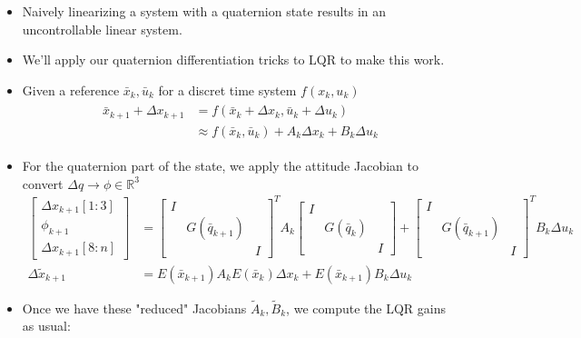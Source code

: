 \begin{itemize}
    \item Naively linearizing a system with a quaternion state results in an uncontrollable linear system.
    \item We'll apply our quaternion differentiation tricks to LQR to make this work.
    \item Given a reference $\bar{x}_k, \bar{u}_k$ for a discret time system $f(x_k, u_k)$
    \begin{align}
        \begin{split}
            \bar{x}_{k+1} + \Delta x_{k+1} & = f(\bar{x}_k + \Delta x_k, \bar{u}_k + \Delta u_k) \\
            & \approx f(\bar{x}_k, \bar{u}_k) + A_k \Delta x_k + B_k \Delta u_k
        \end{split}
    \end{align}
    \item For the quaternion part of the state, we apply the attitude Jacobian to convert $\Delta q \to \phi \in \mathbb{R}^3$
    \begin{align}
        \begin{bmatrix}
            \Delta x_{k+1}[1:3] \\
            \phi_{k+1} \\
            \Delta x_{k+1}[8:n]
        \end{bmatrix} & = 
        \begin{bmatrix}
            I & & \\
             & G(\bar{q}_{k+1}) & \\
             & & I
        \end{bmatrix}^T A_k 
        \begin{bmatrix}
            I & & \\
             & G(\bar{q}_k) & \\
             & & I
        \end{bmatrix} + 
        \begin{bmatrix}
            I & & \\
             & G(\bar{q}_{k+1}) & \\
             & & I
        \end{bmatrix}^T B_k \Delta u_k \\
        \Delta \tilde x_{k+1} & = E(\bar{x}_{k+1}) A_k E(\bar{x}_{k}) \Delta x_k + E(\bar{x}_{k+1}) B_k \Delta u_k
    \end{align}
    \item Once we have these "reduced" Jacobians $\tilde A_k, \tilde B_k$, we compute the LQR gains as usual:

\end{itemize}

